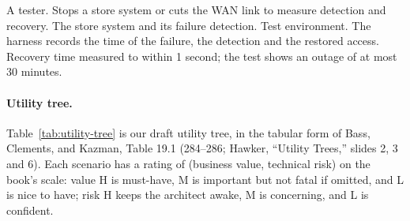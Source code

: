   {A tester.}
  {Stops a store system or cuts the WAN link to measure detection and recovery.}
  {The store system and its failure detection.}
  {Test environment.}
  {The harness records the time of the failure, the detection and the restored access.}
  {Recovery time measured to within 1 second; the test shows an outage of at most 30 minutes.}
\endgroup

\paragraph{Utility tree.}
Table~\ref{tab:utility-tree} is our draft utility tree, in the tabular form of
Bass, Clements, and Kazman, Table 19.1 (284--286; Hawker, ``Utility Trees,'' slides 2,
3 and 6). Each scenario has a rating of (business value, technical risk) on the
book's scale: value H is must-have, M is important but not fatal if omitted, and L is
nice to have; risk H keeps the architect awake, M is concerning, and L is confident.

